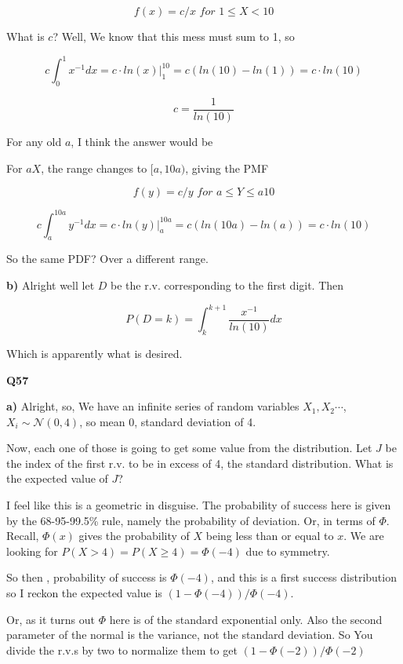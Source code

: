 \documentclass{article}
\begin{document}
			\[ f(x) = c/x\textit{ for } 1\le X < 10 \]
			
			What is $c$? Well, We know that this mess must sum to 1, so
			
			\[ c\int_0^1 x^{-1} dx = c\cdot ln(x)\big|^{10}_1 = c(ln(10) - ln(1)) = c\cdot ln(10) \]
			
			\[  c = \frac{1}{ln(10)	}\]
			
			For any old $a$, I think the answer would be 
			
			For $aX$, the range changes to $[a, 10a)$, giving the PMF
			
			\[ f(y) = c/y \textit{ for } a \le Y \le a10 \]
			
			\[ c\int^{10a}_a y^{-1} dx = c\cdot ln(y)\big|^{10a}_a = c(ln(10a)-ln(a)) = c\cdot ln(10) \]
			
			So the same PDF? Over a different range.
			
			\textbf{b)} Alright well let $D$ be the r.v. corresponding to the first digit. Then 
			
			\[ P(D = k) = \int^{k+1}_k \frac{x^{-1}}{ln(10)} dx \]
			
			Which is apparently what is desired.
			
			\hfill
			
		\textbf{Q57}
		
			\textbf{a)} Alright, so, We have an infinite series of random variables $X_1, X_2 \cdots$, $X_i\sim \mathcal{N}(0, 4)$, so mean 0, standard deviation of 4.
			
			Now, each one of those is going to get some value from the distribution. Let $J$ be the index of the first r.v. to be in excess of 4, the standard distribution. What is the expected value of $J$?
			
			I feel like this is a geometric in disguise. The probability of success here is given by the 68-95-99.5\% rule, namely the probability of deviation. Or, in terms of $\Phi$. Recall, $\Phi(x)$ gives the probability of $X$ being less than or equal to $x$. We are looking for $P(X >4) = P(X\ge 4) = \Phi(-4)$ due to symmetry.
			
			So then , probability of success is $\Phi(-4)$, and this is a first success distribution so I reckon the expected value is $(1-\Phi(-4))/\Phi(-4)$.
			
			Or, as it turns out $\Phi$ here is of the standard exponential only. Also the second parameter of the normal is the variance, not the standard deviation. So You divide the r.v.s by two to normalize them to get $(1-\Phi(-2))/\Phi(-2)$
			
\end{document}
